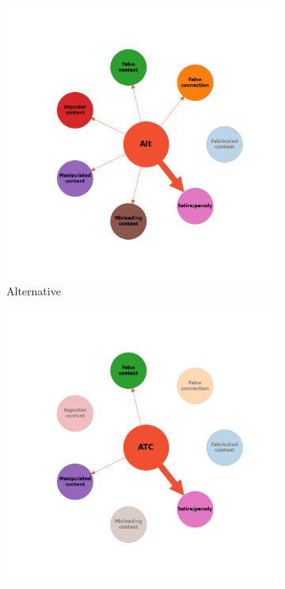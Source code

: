 \documentclass[twocolumn]{article}
\begin{document}
\begin{figure}
\centering
\begin{subfigure}{0.28\textwidth}
    \includegraphics[width=\textwidth]{rebuttal_Alt.png}
    \caption{Alternative}
    \label{fig:rebuttal_alt}
\end{subfigure}
\hfill
\begin{subfigure}{0.28\textwidth}
    \includegraphics[width=\textwidth]{rebuttal_ATC.png}

\end{subfigure}
\end{figure}
\end{document}
